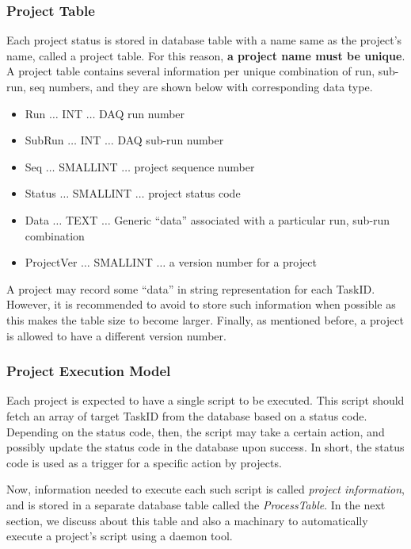 \subsubsection{Project Table}
Each project status is stored in {\psql} database table with a name same
as the project's name, called a project table. For this reason, {\bf a 
project name must be unique}. A project table contains several information 
per unique combination of run, sub-run, seq numbers, and they are shown below 
with corresponding {\psql} data type.
\begin{itemize}
\item Run $\ldots$ INT $\ldots$ DAQ run number
\item SubRun $\ldots$ INT $\ldots$ DAQ sub-run number
\item Seq $\ldots$ SMALLINT $\ldots$ project sequence number
\item Status $\ldots$ SMALLINT $\ldots$ project status code
\item Data $\ldots$ TEXT $\ldots$ Generic ``data'' associated with a particular run, sub-run combination
\item ProjectVer $\ldots$ SMALLINT $\ldots$ a version number for a project
\end{itemize}
A project may record some ``data'' in string representation for each TaskID.
However, it is recommended to avoid to store such information when possible 
as this makes the table size to become larger. Finally, as mentioned before,
a project is allowed to have a different version number. 

\subsubsection{Project Execution Model}
Each project is expected to have a single {\python} script to be executed.
This {\python} script should fetch an array of target TaskID from the 
database based on a status code. Depending on the status code, then, the
script may take a certain action, and possibly update the status code in the
database upon success. In short, the status code is used as a trigger for
a specific action by projects. 

Now, information needed to execute each such script is called {\it project
information}, and is stored in a separate database table called the 
{\it ProcessTable}. In the next section, we discuss about this table and
also a machinary to automatically execute a project's {\python} script
using a daemon tool.

